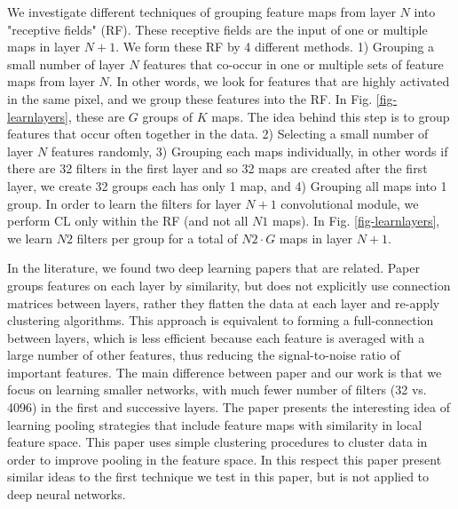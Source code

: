 \documentclass{article} %
\begin{document}
We investigate different techniques of grouping feature maps from layer $N$ into "receptive fields" (RF). These receptive fields are the input of one or multiple maps in layer $N+1$. We form these RF by 4 different methods. 1) Grouping a small number of layer $N$ features that co-occur in one or multiple sets of feature maps from layer $N$. In other words, we look for features that are highly activated in the same pixel, and we group these features into the RF. In Fig. \ref{fig-learnlayers}, these are $G$ groups of $K$ maps. The idea behind this step is to group features that occur often together in the data. 2) Selecting a small number of layer $N$ features randomly, 3) Grouping each maps individually, in other words if there are 32 filters in the first layer and so 32 maps are created after the first layer, we create 32 groups each has only 1 map, and 4) Grouping all maps into 1 group. 
In order to learn the filters for layer $N+1$ convolutional module, we perform CL only within the RF (and not all $N1$ maps). In Fig. \ref{fig-learnlayers}, we learn $N2$ filters per group for a total of $N2 \cdot G$ maps in layer $N+1$.

In the literature, we found two deep learning papers that are related. 
Paper \cite{coates2012learning} groups features on each layer by similarity, but does not explicitly use connection matrices between layers, rather they flatten the data at each layer and re-apply clustering algorithms. This approach is equivalent to forming a full-connection between layers, which is less efficient because each feature is averaged with a large number of other features, thus reducing the signal-to-noise ratio of important features. The main difference between paper \cite{coates2012learning} and our work is that we focus on learning smaller networks, with much fewer number of filters (32 vs. 4096) in the first and successive layers. 
The paper \cite{boureau_2011} presents the interesting idea of learning pooling strategies that include feature maps with similarity in local feature space. This paper uses simple clustering procedures to cluster data in order to improve pooling in the feature space. In this respect this paper present similar ideas to the first technique we test in this paper, but is not applied to deep neural networks.

\end{document}

